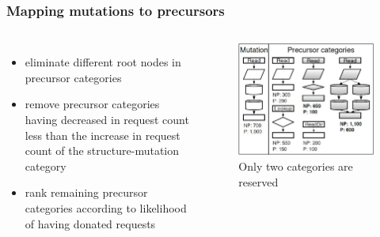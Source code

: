 \documentclass[11pt]{beamer}
\begin{document}
\begin{frame}
\frametitle{Mapping mutations to precursors}
\begin{columns}
\begin{itemize}
  \item eliminate different root nodes in precursor categories
  \item remove precursor categories having decreased in request count less than the increase in
  request count of the structure-mutation category
  \item rank remaining precursor categories according to likelihood of
  having donated requests
\end{itemize}
\begin{figure}[htbp]
\centering
\includegraphics[width=\textwidth]{fig/mapping.jpg}
\caption{Only two categories are reserved}
\end{figure}
\end{columns}
\end{frame}
\end{document}
